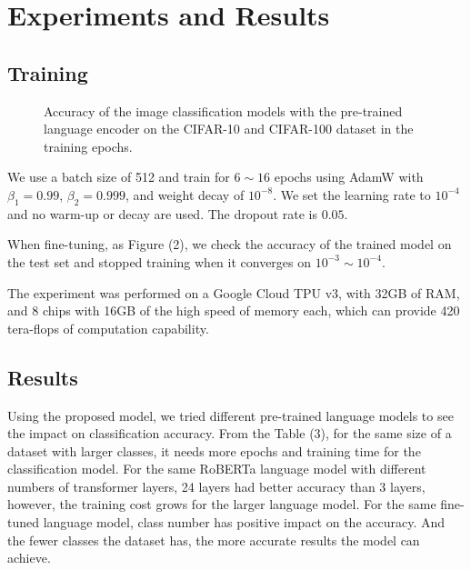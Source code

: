 \documentclass[runningheads]{llncs}
\begin{document}
\section{Experiments and Results}


\subsection{Training}

\begin{figure*}
\begin{center}
\end{center}
   \caption{Accuracy of the image classification models with the pre-trained language encoder on the CIFAR-10 and CIFAR-100 dataset in the training epochs.}
\label{fig:short}
\end{figure*}



We use a batch size of 512 and train for $6\sim16$ epochs using AdamW with $\beta_1=0.99$, $\beta_2=0.999$, and weight decay of $10^{-8}$.
We set the learning rate to $10^{-4}$ and no warm-up or decay are used.
The dropout rate is $0.05$.

\par When fine-tuning, as Figure (2), we check the accuracy of the trained model on the test set and stopped training when it converges on $10^{-3}\sim10^{-4}$.

\par The experiment was performed on a Google Cloud TPU v3, with 32GB of RAM, and 8 chips with 16GB of the high speed of memory each,
which can provide 420 tera-flops of computation capability.

\subsection{Results}

Using the proposed model, we tried different pre-trained language models to see the impact on classification accuracy.
From the Table (3), for the same size of a dataset with larger classes, it needs more epochs and training time for the classification model.
For the same RoBERTa language model with different numbers of transformer layers, 24 layers had better accuracy than 3 layers,
however, the training cost grows for the larger language model.
For the same fine-tuned language model, class number has positive impact on the accuracy.
And the fewer classes the dataset has, the more accurate results the model can achieve.
\end{document}
